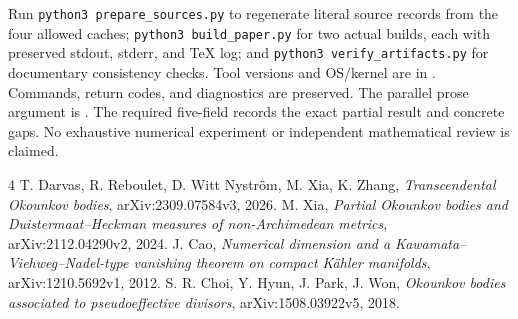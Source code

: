\documentclass[11pt]{article}
\begin{document}
Run \texttt{python3 prepare\_sources.py} to regenerate literal source records from the four allowed caches; \texttt{python3 build\_paper.py} for two actual builds, each with preserved stdout, stderr, and TeX log; and \texttt{python3 verify\_artifacts.py} for documentary consistency checks. Tool versions and OS/kernel are in . Commands, return codes, and diagnostics are preserved. The parallel prose argument is . The required five-field  records the exact partial result and concrete gaps. No exhaustive numerical experiment or independent mathematical review is claimed.

\begin{thebibliography}{4}
 T. Darvas, R. Reboulet, D. Witt Nystr\"om, M. Xia, K. Zhang, \emph{Transcendental Okounkov bodies}, arXiv:2309.07584v3, 2026.
 M. Xia, \emph{Partial Okounkov bodies and Duistermaat--Heckman measures of non-Archimedean metrics}, arXiv:2112.04290v2, 2024.
 J. Cao, \emph{Numerical dimension and a Kawamata--Viehweg--Nadel-type vanishing theorem on compact K\"ahler manifolds}, arXiv:1210.5692v1, 2012.
 S. R. Choi, Y. Hyun, J. Park, J. Won, \emph{Okounkov bodies associated to pseudoeffective divisors}, arXiv:1508.03922v5, 2018.
\end{thebibliography}
\end{document}

